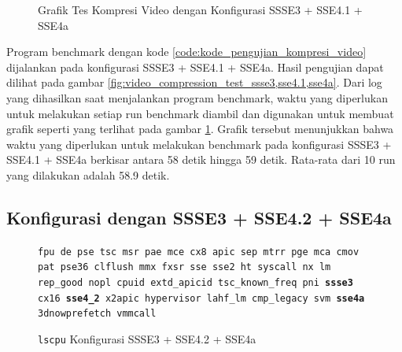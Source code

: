 \begin{figure}
    \centering
    \caption{Grafik Tes Kompresi Video dengan Konfigurasi SSSE3 + SSE4.1 + SSE4a}
    \label{fig:video_compression_test_ssse3,sse4.1,sse4a_graph}
\end{figure}

Program benchmark dengan kode \ref{code:kode_pengujian_kompresi_video} dijalankan pada konfigurasi SSSE3 + SSE4.1 + SSE4a. Hasil pengujian dapat dilihat pada gambar \ref{fig:video_compression_test_ssse3,sse4.1,sse4a}. Dari log yang dihasilkan saat menjalankan program benchmark, waktu yang diperlukan untuk melakukan setiap run benchmark diambil dan digunakan untuk membuat grafik seperti yang terlihat pada gambar \ref{fig:video_compression_test_ssse3,sse4.1,sse4a_graph}. Grafik tersebut menunjukkan bahwa waktu yang diperlukan untuk melakukan benchmark pada konfigurasi SSSE3 + SSE4.1 + SSE4a berkisar antara 58 detik hingga 59 detik. Rata-rata dari 10 run yang dilakukan adalah 58.9 detik.

\subsection{Konfigurasi dengan SSSE3 + SSE4.2 + SSE4a}
\begin{figure}
    \texttt{fpu de pse tsc msr pae mce cx8 apic sep mtrr pge mca cmov pat pse36 clflush mmx fxsr sse sse2 ht syscall nx lm rep\_good nopl cpuid extd\_apicid tsc\_known\_freq pni \textbf{ssse3} cx16 \textbf{sse4\_2} x2apic hypervisor lahf\_lm cmp\_legacy svm \textbf{sse4a} 3dnowprefetch vmmcall}
    \caption{\texttt{lscpu} Konfigurasi SSSE3 + SSE4.2 + SSE4a}
    \label{fig:lscpu_video_compression_test_ssse3,sse4.2,sse4a.jpeg}
\end{figure}

